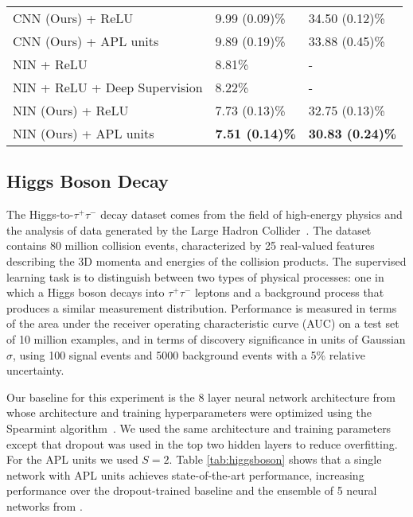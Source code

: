 \documentclass{article} \usepackage{iclr2015,times}
\begin{document}
\begin{table}[h]
\begin{center}
\begin{tabular}{p{8.4cm}p{2.2cm}p{2.2cm}}
CNN (Ours) + ReLU  &  9.99 (0.09)\%  & 34.50 (0.12)\%  \\
CNN (Ours) + APL units  &  9.89 (0.19)\%  &33.88 (0.45)\%  \\
\hline
NIN + ReLU \citep{lin2013network} & 8.81\% & - \\
NIN + ReLU + Deep Supervision \citep{lee2014deeply} & 8.22\% & - \\
NIN (Ours) + ReLU & 7.73 (0.13)\%   & 32.75 (0.13)\%  \\
NIN (Ours) + APL units & \bf7.51 (0.14)\%  &  \bf30.83 (0.24)\%   \\
\hline
\end{tabular}
\end{center}
\end{table}






\subsection{Higgs Boson Decay}
The Higgs-to-$\tau^+\tau^-$ decay dataset comes from the field of high-energy physics and the analysis of data generated by the Large Hadron Collider~\citep{baldi2014enhanced}. The dataset contains 80 million collision events, characterized by 25 real-valued features describing the 3D momenta and energies of the collision products. The supervised learning task is to distinguish between two types of physical processes: one in which a Higgs boson decays into $\tau^+\tau^-$ leptons and a background process that produces a similar measurement distribution. Performance is measured in terms of the area under the receiver operating characteristic curve (AUC) on a test set of 10 million examples, and in terms of discovery significance \citep{Cowan2010js} in units of Gaussian $\sigma$, using 100 signal events and 5000 background events with a 5\% relative uncertainty.
 
Our baseline for this experiment is the 8 layer neural network architecture from \citep{baldi2014enhanced} whose architecture and training hyperparameters were optimized using the Spearmint algorithm~\citep{snoek2012practical}. We used the same architecture and training parameters except that dropout was used in the top two hidden layers to reduce overfitting. For the APL units we used $S=2$. Table \ref{tab:higgsboson} shows that a single network with APL units achieves state-of-the-art performance, increasing performance over the dropout-trained baseline and the ensemble of 5 neural networks from \citep{baldi2014enhanced}. 
\end{document}
